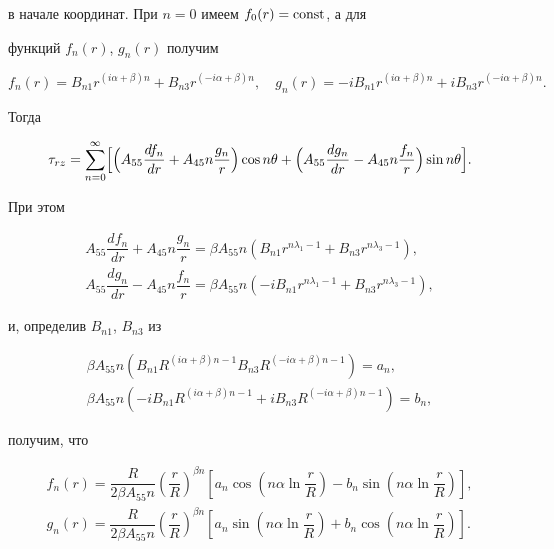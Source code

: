 в начале координат. При $ n=0 $ имеем $ f_0(r)={\rm const}$, а для

функций $ f_n(r)$, $g_n(r) $ получим 

$$

f_n(r)=B_{n1}r^{(i\alpha+\beta)n} +B_{n3}r^{(-i\alpha+\beta)n},\quad 

g_n(r)=-iB_{n1}r^{(i\alpha+\beta)n} +iB_{n3}r^{(-i\alpha+\beta)n}.

$$

Тогда

\[

\tau_{rz}= \sum_{n=0}^\infty \Bigl[ \Bigl( A_{55}\dfrac{d f_n}{dr}+A_{45}n \dfrac{g_n}{r}\Bigr)

 \cos n\theta +  \Bigl( A_{55}\dfrac{d g_n}{dr}-A_{45}n \dfrac{f_n}{r}\Bigr) \sin n\theta \Bigr].

\]

При этом

$$

\begin{array}{l}

A_{55}\dfrac{d f_n}{dr}+A_{45}n \dfrac{g_n}{r}=\beta A_{55}n \left(B_{n1}r^{n \lambda_1  -1}+ B_{n3} r^{n\lambda_3 -1} \right), \\[2mm]

A_{55}\dfrac{d g_n}{dr}-A_{45}n \dfrac{f_n}{r}= \beta A_{55} n \left(-iB_{n1}r^{ n\lambda_1 -1} + B_{n3} r^{ n\lambda_3 -1} \right),

\end{array}

$$

и, определив $ B_{n1}$, $B_{n3} $ из 

$$

\begin{array}{l}

\beta A_{55}n \left( B_{n1}R^{(i\alpha+\beta)n -1} B_{n3}R^{(-i\alpha+\beta)n-1} \right)=a_n,\\

\beta A_{55} n \left( -iB_{n1}R^{(i\alpha+\beta)n-1} +i B_{n3}R^{(-i\alpha+\beta)n-1} \right)=b_n,

\end{array}

$$

получим, что

\begin{gather*}

f_n(r)=\dfrac{R}{2 \beta A_{55} n}\left(\dfrac{r}{R} \right)^{\beta n} \left[a_n\cos

\left(n\alpha \ln \dfrac{r}{R} \right)- b_n\sin \left(n\alpha \ln \dfrac{r}{R} \right)\right],\\

g_n(r)= \dfrac{R}{2\beta A_{55} n} \left(\dfrac{r}{R}\right)^{\beta n} \left[ a_n\sin \left(n\alpha \ln \dfrac{r}{R} \right)

+b_n\cos \left(n\alpha \ln \dfrac{r}{R}\right) \right].

\end{gather*}

